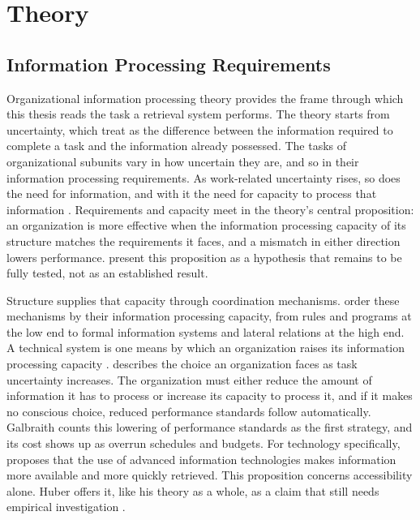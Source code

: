\chapter{Theory}

\section{Information Processing Requirements}

Organizational information processing theory provides the frame through which
this thesis reads the task a retrieval system performs. The theory starts from
uncertainty, which \textcite[615]{tushman1978} treat as the difference between
the information required to complete a task and the information already
possessed. The tasks of organizational subunits vary in how uncertain they are,
and so in their information processing requirements. As work-related
uncertainty rises, so does the need for information, and with it the need for
capacity to process that information \parencite[615--616]{tushman1978}.
Requirements and capacity meet in the theory's central proposition: an
organization is more effective when the information processing capacity of its
structure matches the requirements it faces, and a mismatch in either direction
lowers performance. \textcite[619--620, 622]{tushman1978} present this
proposition as a hypothesis that remains to be fully tested, not as an
established result.

Structure supplies that capacity through coordination mechanisms.
\textcite[618]{tushman1978} order these mechanisms by their information
processing capacity, from rules and programs at the low end to formal
information systems and lateral relations at the high end. A technical system is
one means by which an organization raises its information processing capacity
\parencite[618]{tushman1978}. \textcite[29, 36]{galbraith1974} describes the
choice an organization faces as task uncertainty increases. The organization must either
reduce the amount of information it has to process or increase its capacity to
process it, and if it makes no conscious choice, reduced performance standards
follow automatically. Galbraith counts this lowering of performance standards
as the first strategy, and its cost shows up as overrun
schedules and budgets. For technology specifically, \textcite[65]{huber1990}
proposes that the use of advanced information technologies makes information
more available and more quickly retrieved. This proposition concerns
accessibility alone. Huber offers it, like his theory as a whole, as a
claim that still needs empirical investigation
\parencite[47, 67]{huber1990}.

